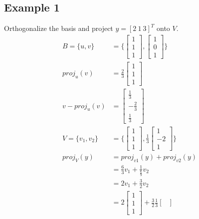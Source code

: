 \documentclass{article}
\theoremstyle{mytheoremstyle}
\theoremstyle{mytheoremstyle}
\theoremstyle{myproblemstyle}
\begin{document}
    \subsection*{Example 1}
    Orthogonalize the basis and project $y = [2\ 1\ 3]^T$ onto $V$.
    \begin{align*}
        B = \{u, v\} &= \Bigg\{
        \begin{bmatrix}
            1 \\ 1 \\ 1
        \end{bmatrix},
        \begin{bmatrix}
            1 \\ 0 \\ 1
        \end{bmatrix}
        \Bigg\} \\
        proj_u(v) &= \frac{2}{3} \begin{bmatrix}
            1 \\ 1 \\ 1
        \end{bmatrix} \\
        v-proj_u(v) &= \begin{bmatrix}
            \frac{1}{3} \\ -\frac{2}{3} \\ \frac{1}{3}
        \end{bmatrix} \\
        V = \{v_1, v_2\} &= \Bigg\{
        \begin{bmatrix}
            1 \\ 1 \\ 1
        \end{bmatrix},
        \frac{1}{3} \begin{bmatrix}
            1 \\ -2 \\ 1
        \end{bmatrix}
        \Bigg\} \\
        proj_V(y) &= proj_{v1}(y) + proj_{v2}(y) \\
        &= \frac{6}{3} v_1 + \frac{1}{\frac{6}{9}} v_2 \\
        &= 2 v_1 + \frac{3}{2} v_2 \\
        &= 2 \begin{bmatrix}
            1 \\ 1 \\ 1
        \end{bmatrix}
        + \frac{3}{2} \frac{1}{3} \begin{bmatrix}

\end{bmatrix}
\end{align*}
\end{document}
